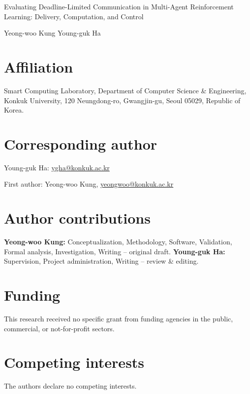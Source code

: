 \documentclass[pdflatex,sn-mathphys-num]{sn-jnl}
\begin{document}
\pagestyle{headings}
{\Titlefont Evaluating Deadline-Limited Communication in Multi-Agent Reinforcement Learning: Delivery, Computation, and Control\par}
\vspace{12pt}
{\Authorfont Yeong-woo Kung \enspace\textperiodcentered\enspace Young-guk Ha\par}
\section*{Affiliation}
Smart Computing Laboratory, Department of Computer Science \& Engineering, Konkuk University, 120 Neungdong-ro, Gwangjin-gu, Seoul 05029, Republic of Korea.
\section*{Corresponding author}
Young-guk Ha: \href{mailto:ygha@konkuk.ac.kr}{ygha@konkuk.ac.kr}
\par First author: Yeong-woo Kung, \href{mailto:yeongwoo@konkuk.ac.kr}{yeongwoo@konkuk.ac.kr}
\section*{Author contributions}
\textbf{Yeong-woo Kung:} Conceptualization, Methodology, Software, Validation, Formal analysis, Investigation, Writing -- original draft. \textbf{Young-guk Ha:} Supervision, Project administration, Writing -- review \& editing.
\section*{Funding}
This research received no specific grant from funding agencies in the public, commercial, or not-for-profit sectors.
\section*{Competing interests}
The authors declare no competing interests.
\end{document}
